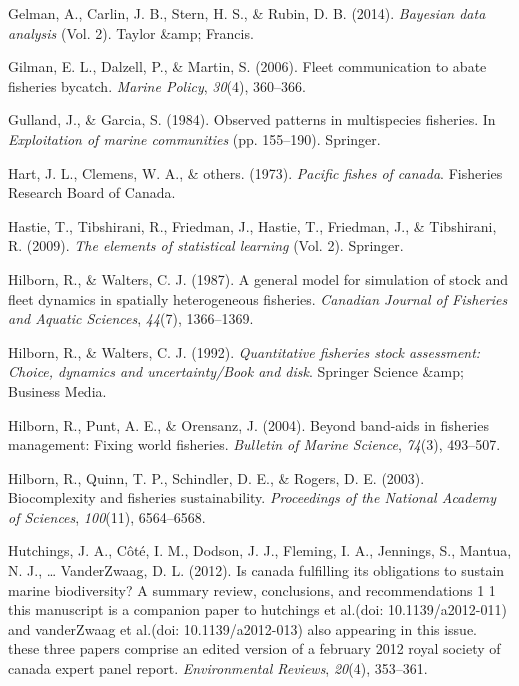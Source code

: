 \documentclass[12pt,]{scrartcl}
\begin{document}
\hypertarget{ref-gelman2014bayesian}{}
Gelman, A., Carlin, J. B., Stern, H. S., \& Rubin, D. B. (2014).
\emph{Bayesian data analysis} (Vol. 2). Taylor \&amp; Francis.

\hypertarget{ref-gilman2006fleet}{}
Gilman, E. L., Dalzell, P., \& Martin, S. (2006). Fleet communication to
abate fisheries bycatch. \emph{Marine Policy}, \emph{30}(4), 360--366.

\hypertarget{ref-gulland1984observed}{}
Gulland, J., \& Garcia, S. (1984). Observed patterns in multispecies
fisheries. In \emph{Exploitation of marine communities} (pp. 155--190).
Springer.

\hypertarget{ref-hart1973pacific}{}
Hart, J. L., Clemens, W. A., \& others. (1973). \emph{Pacific fishes of
canada}. Fisheries Research Board of Canada.

\hypertarget{ref-hastie2009elements}{}
Hastie, T., Tibshirani, R., Friedman, J., Hastie, T., Friedman, J., \&
Tibshirani, R. (2009). \emph{The elements of statistical learning} (Vol.
2). Springer.

\hypertarget{ref-hilborn1987general}{}
Hilborn, R., \& Walters, C. J. (1987). A general model for simulation of
stock and fleet dynamics in spatially heterogeneous fisheries.
\emph{Canadian Journal of Fisheries and Aquatic Sciences}, \emph{44}(7),
1366--1369.

\hypertarget{ref-hilborn1992quantitative}{}
Hilborn, R., \& Walters, C. J. (1992). \emph{Quantitative fisheries
stock assessment: Choice, dynamics and uncertainty/Book and disk}.
Springer Science \&amp; Business Media.

\hypertarget{ref-hilborn2004beyond}{}
Hilborn, R., Punt, A. E., \& Orensanz, J. (2004). Beyond band-aids in
fisheries management: Fixing world fisheries. \emph{Bulletin of Marine
Science}, \emph{74}(3), 493--507.

\hypertarget{ref-hilborn2003biocomplexity}{}
Hilborn, R., Quinn, T. P., Schindler, D. E., \& Rogers, D. E. (2003).
Biocomplexity and fisheries sustainability. \emph{Proceedings of the
National Academy of Sciences}, \emph{100}(11), 6564--6568.

\hypertarget{ref-hutchings2012canada}{}
Hutchings, J. A., Côté, I. M., Dodson, J. J., Fleming, I. A., Jennings,
S., Mantua, N. J., \ldots{} VanderZwaag, D. L. (2012). Is canada
fulfilling its obligations to sustain marine biodiversity? A summary
review, conclusions, and recommendations 1 1 this manuscript is a
companion paper to hutchings et al.(doi: 10.1139/a2012-011) and
vanderZwaag et al.(doi: 10.1139/a2012-013) also appearing in this issue.
these three papers comprise an edited version of a february 2012 royal
society of canada expert panel report. \emph{Environmental Reviews},
\emph{20}(4), 353--361.
\end{document}
